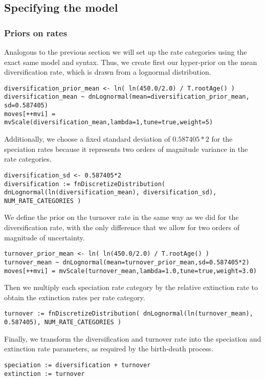 \subsection{Specifying the model}

\subsubsection{Priors on rates}
Analogous to the previous section we will set up the rate categories using the exact same model and \Rev syntax.
Thus, we create first our hyper-prior on the mean diversification rate, which is drawn from a lognormal distribution.
{\tt \begin{snugshade*}
\begin{lstlisting}
diversification_prior_mean <- ln( ln(450.0/2.0) / T.rootAge() )
diversification_mean ~ dnLognormal(mean=diversification_prior_mean, sd=0.587405)
moves[++mvi] = mvScale(diversification_mean,lambda=1,tune=true,weight=5)
\end{lstlisting}
\end{snugshade*}}
Additionally, we choose a fixed standard deviation of $0.587405*2$ for the speciation rates because it represents two orders of magnitude variance in the rate categories.
{\tt \begin{snugshade*}
\begin{lstlisting}
diversification_sd <- 0.587405*2
diversification := fnDiscretizeDistribution( dnLognormal(ln(diversification_mean), diversification_sd), NUM_RATE_CATEGORIES )
\end{lstlisting}
\end{snugshade*}}
We define the prior on the turnover rate in the same way as we did for the diversification rate, with the only difference that we allow for two orders of magnitude of uncertainty.
{\tt \begin{snugshade*}
\begin{lstlisting}
turnover_prior_mean <- ln( ln(450.0/2.0) / T.rootAge() )
turnover_mean ~ dnLognormal(mean=turnover_prior_mean,sd=0.587405*2) 
moves[++mvi] = mvScale(turnover_mean,lambda=1.0,tune=true,weight=3.0)
\end{lstlisting}
\end{snugshade*}}
Then we multiply each speciation rate category by the relative extinction rate to obtain the extinction rates per rate category.
{\tt \begin{snugshade*}
\begin{lstlisting}
turnover := fnDiscretizeDistribution( dnLognormal(ln(turnover_mean), 0.587405), NUM_RATE_CATEGORIES )
\end{lstlisting}
\end{snugshade*}}
Finally, we transform the diversification and turnover rate into the speciation and extinction rate parameters, as required by the birth-death process.
{\tt \begin{snugshade*}
\begin{lstlisting}
speciation := diversification + turnover
extinction := turnover 
\end{lstlisting}
\end{snugshade*}}

